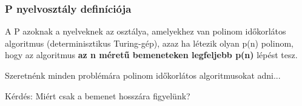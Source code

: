 \begin{frame}
\frametitle{P nyelvosztály definíciója}

A P azoknak a nyelveknek az osztálya, amelyekhez van polinom időkorlátos
algoritmus (determinisztikus Turing-gép), azaz ha létezik olyan p(n) polinom, hogy
az algoritmus \textbf{az n méretű bemeneteken legfeljebb p(n)} lépést tesz.

Szeretnénk minden problémára polinom időkorlátos algoritmusokat adni...

Kérdés: Miért csak a bemenet hosszára figyelünk?

\end{frame}

